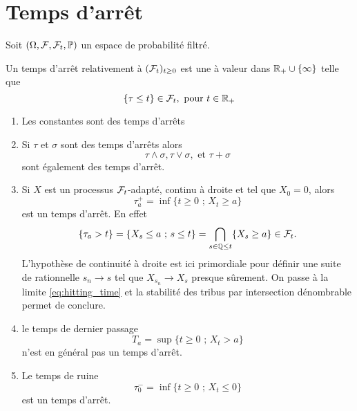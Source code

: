 \section{Temps d'arrêt}\label{sec:temps_arret_contd}
Soit $(\Omega,\mathcal{F}, \mathcal{F}_t,\mathbb{P})$ un espace de probabilité filtré.
\begin{definition}
Un temps d'arrêt relativement à $(\mathcal{F}_t)_{t\geq0}$ est une \va à valeur dans $\mathbb{R}_+\cup\{\infty\}$ telle que 
$$
\{\tau\leq t\}\in\mathcal{F}_t,\text{ pour }t\in\mathbb{R}_+
$$

\end{definition}
\begin{ex}
\begin{enumerate}
    \item Les constantes sont des temps d'arrêts
    \item Si $\tau$ et $\sigma$ sont des temps d'arrêts alors 
    $$
    \tau\land\sigma, \tau\vee\sigma,\text{ et }\tau + \sigma
    $$
    sont également des temps d'arrêt.
    \item Si $X$ est un processus $\mathcal{F}_t$-adapté, continu à droite et tel que $X_0 = 0$, alors 
    $$
    \tau_a^+ = \inf\{t\geq 0\text{ ; }X_t\geq a\}
    $$
    est un temps d'arrêt. En effet
    \begin{equation}\label{eq:hitting_time}
    \{\tau_a>t\} = \{X_s\leq a\text{ ; }s\leq t\} = \bigcap_{s\in\mathbb{Q}\leq t}\{X_s\geq a\}\in\mathcal{F}_t.
    \end{equation}
    L'hypothèse de continuité à droite est ici primordiale pour définir une suite de rationnelle $s_n\rightarrow s$ tel que $X_{s_n}\rightarrow X_s$ presque sûrement. On passe à la limite \eqref{eq:hitting_time} et la stabilité des tribus par intersection dénombrable permet de conclure.
    \item le temps de dernier passage 
        $$
    T_a = \sup\{t\geq 0\text{ ; }X_t>a\}
    $$
    n'est en général pas un temps d'arrêt.
    \item Le temps de ruine
    $$
    \tau_0^- = \inf\{t\geq 0\text{ ; }X_t\leq 0\}
    $$
    est un temps d'arrêt.
\end{enumerate}
\end{ex}
